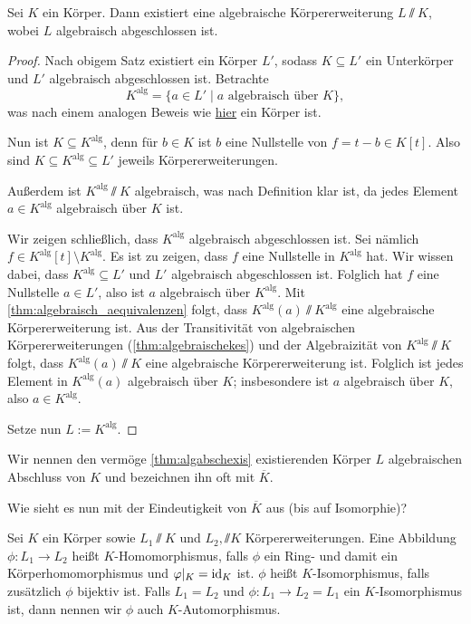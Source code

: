 \documentclass[12pt,a4paper]{scrartcl}
\begin{document}
\begin{satz}\label{thm:algabschexis}
	Sei $K$ ein Körper. Dann existiert eine algebraische Körpererweiterung $L\sslash K$, wobei $L$ algebraisch abgeschlossen ist.
\end{satz}
\begin{proof}
	Nach obigem Satz existiert ein Körper $L'$, sodass $K\subseteq L'$ ein Unterkörper und $L'$ algebraisch abgeschlossen ist. Betrachte
	\[K^{\text{alg}} = \{a\in L' \mid a\text{ algebraisch über } K\},\]
	was nach einem analogen Beweis wie \hyperref[enumi:IQalgkoerp]{hier} ein Körper ist.
	
	Nun ist $K\subseteq K^{\text{alg}}$, denn für $b\in K$ ist $b$ eine Nullstelle von $f = t-b\in K[t]$. Also sind $K\subseteq K^{\text{alg}}\subseteq L'$ jeweils Körpererweiterungen.
	
	Außerdem ist $K^{\text{alg}}\sslash K$ algebraisch, was nach Definition klar ist, da jedes Element $a\in K^{\text{alg}}$ algebraisch über $K$ ist.
	
	Wir zeigen schließlich, dass $K^{\text{alg}}$ algebraisch abgeschlossen ist. Sei nämlich $f\in K^{\text{alg}}[t]\setminus K^{\text{alg}}$. Es ist zu zeigen, dass $f$ eine Nullstelle in $K^{\text{alg}}$ hat. Wir wissen dabei, dass $K^{\text{alg}}\subseteq L'$ und $L'$ algebraisch abgeschlossen ist. Folglich hat $f$ eine Nullstelle $a\in L'$, also ist $a$ algebraisch über $K^{\text{alg}}$. Mit \cref{thm:algebraisch_aequivalenzen} folgt, dass $K^{\text{alg}}(a)\sslash K^{\text{alg}}$ eine algebraische Körpererweiterung ist. Aus der Transitivität von algebraischen Körpererweiterungen (\cref{thm:algebraischekes}) und der Algebraizität von $K^{\text{alg}}\sslash K$ folgt, dass $K^{\text{alg}}(a)\sslash K$  eine algebraische Körpererweiterung ist. Folglich ist jedes Element in $K^{\text{alg}}(a)$ algebraisch über $K$; insbesondere ist $a$ algebraisch über $K$, also $a\in K^{\text{alg}}$.
	
	Setze nun $L:= K^{\text{alg}}$.
\end{proof}

\begin{defi}
	Wir nennen den vermöge \cref{thm:algabschexis} existierenden Körper $L$ algebraischen Abschluss von $K$ und bezeichnen ihn oft mit $\overline{K}$.
\end{defi}
Wie sieht es nun mit der Eindeutigkeit von $\overline{K}$ aus (bis auf Isomorphie)?
\begin{defi}
	Sei $K$ ein Körper sowie $L_1\sslash K$ und $L_2, \sslash K$ Körpererweiterungen. Eine Abbildung $\phi\colon L_1\to L_2$ heißt $K$-Homomorphismus, falls $\phi$ ein Ring- und damit ein Körperhomomorphismus und $\varphi|_K = \operatorname{id}_K$ ist. $\phi$ heißt $K$-Isomorphismus, falls zusätzlich $\phi$ bijektiv ist. Falls $L_1 = L_2$ und $\phi\colon L_1\to L_2 = L_1$ ein $K$-Isomorphismus ist, dann nennen wir $\phi$ auch $K$-Automorphismus.
\end{defi}
\end{document}
